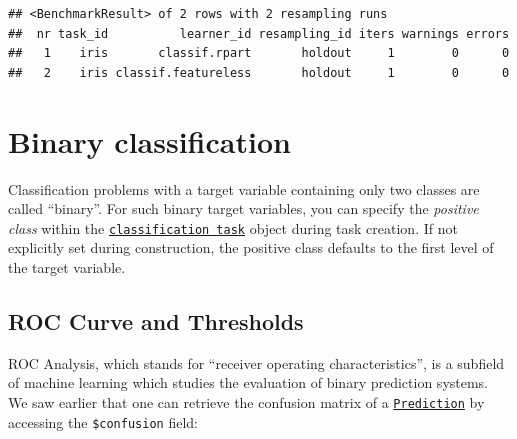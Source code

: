 \documentclass[]{scrbook}
\newenvironment{Shaded}{\begin{snugshade}}{\end{snugshade}}
\newcommand{\CommentTok}[1]{\textcolor[rgb]{0.56,0.35,0.01}{\textit{#1}}}
\newcommand{\DataTypeTok}[1]{\textcolor[rgb]{0.13,0.29,0.53}{#1}}
\newcommand{\KeywordTok}[1]{\textcolor[rgb]{0.13,0.29,0.53}{\textbf{#1}}}
\newcommand{\NormalTok}[1]{#1}
\newcommand{\OperatorTok}[1]{\textcolor[rgb]{0.81,0.36,0.00}{\textbf{#1}}}
\newcommand{\StringTok}[1]{\textcolor[rgb]{0.31,0.60,0.02}{#1}}
\renewenvironment{Shaded} {\begin{snugshade}\small} {\end{snugshade}}
\begin{document}
\begin{verbatim}
## <BenchmarkResult> of 2 rows with 2 resampling runs
##  nr task_id          learner_id resampling_id iters warnings errors
##   1    iris       classif.rpart       holdout     1        0      0
##   2    iris classif.featureless       holdout     1        0      0
\end{verbatim}

\hypertarget{binary-classification}{%
\section{Binary classification}\label{binary-classification}}

Classification problems with a target variable containing only two classes are called ``binary''.
For such binary target variables, you can specify the \emph{positive class} within the \href{https://mlr3.mlr-org.com/reference/TaskClassif.html}{\texttt{classification\ task}} object during task creation.
If not explicitly set during construction, the positive class defaults to the first level of the target variable.

\begin{Shaded}
\end{Shaded}

\hypertarget{binary-roc}{%
\subsection{ROC Curve and Thresholds}\label{binary-roc}}

ROC Analysis, which stands for ``receiver operating characteristics'', is a subfield of machine learning which studies the evaluation of binary prediction systems.
We saw earlier that one can retrieve the confusion matrix of a \href{https://mlr3.mlr-org.com/reference/Prediction.html}{\texttt{Prediction}} by accessing the \texttt{\$confusion} field:
\end{document}
